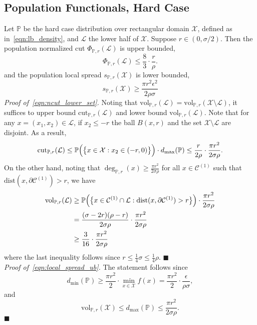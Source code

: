 \documentclass[twoside,11pt]{article}
\newcommand{\1}{\mathbf{1}}
\newcommand{\mc}[1]{\mathcal{#1}}
\newcommand{\Pbb}{\mathbb{P}}
\newcommand{\vol}{\mathrm{vol}}
\newcommand{\cut}{\mathrm{cut}}
\newcommand{\qed}{\hfill $\blacksquare$}
\begin{document}
\subsection{Population Functionals, Hard Case}
\label{subsec:density_cluster_hard_case}
Let $\Pbb$ be the hard case distribution over rectangular domain $\mc{X}$, defined as in~\eqref{eqn:lb_density}, and $\mc{L}$ the lower half of $\mc{X}$. Suppose $r \in (0,\sigma/2)$. Then the population normalized cut $\Phi_{\Pbb,r}(\mathcal{L})$ is upper bounded,
\begin{equation}
\label{eqn:ncut_lower_set}
\Phi_{\Pbb,r}(\mc{L}) \leq \frac{8}{3} \cdot \frac{r}{\rho}.
\end{equation}
and the population local spread $s_{\Pbb,r}(\mc{X})$ is lower bounded,
\begin{equation}
\label{eqn:local_spread_ub}
s_{\Pbb,r}(\mc{X}) \geq \frac{\pi r^2 \epsilon^2}{2 \rho\sigma}
\end{equation}
\emph{Proof of~\eqref{eqn:ncut_lower_set}.}
Noting that $\vol_{\Pbb,r}(\mathcal{L}) = \vol_{\Pbb,r}(\mathcal{X} \setminus \mathcal{L})$, it suffices to upper bound $\cut_{\Pbb,r}(\mathcal{L})$ and lower bound $\vol_{\Pbb,r}(\mathcal{L})$. Note that for any $x = (x_1,x_2) \in \mathcal{L}$, if $x_2 \leq -r$ the ball $B(x,r)$ and the set $\mathcal{X}\setminus\mathcal{L}$ are disjoint. As a result,
\begin{equation*}
\cut_{\Pbb,r}(\mathcal{L}) \leq \Pbb\Bigl(\bigl\{x \in \mathcal{X}: x_2 \in (-r,0)\bigr\}\Bigr) \cdot d_{\max}(\Pbb) \leq \frac{r}{2 \rho} \cdot \frac{\pi r^2}{2 \sigma \rho}.
\end{equation*}
On the other hand, noting that $\deg_{\Pbb,r}(x) \geq \frac{\pi r^2}{2 \sigma \rho}$ for all $x \in \mc{C}^{(1)}$ such that $\mathrm{dist}(x, \partial \mc{C}^{(1)}) > r$, we have
\begin{align*}
\vol_{\Pbb,r}(\mathcal{L}) & \geq \Pbb\Bigl(\bigl\{x \in \mc{C}^{(1)} \cap \mathcal{L}: \mathrm{dist}(x, \partial \mc{C}^{(1)}) > r\bigr\}\Bigr) \cdot \frac{\pi r^2}{2 \sigma \rho} \\
& = \frac{(\sigma - 2r)(\rho - r)}{2 \sigma \rho} \cdot \frac{\pi r^2}{2 \sigma \rho}  \\
& \geq \frac{3}{16} \cdot \frac{\pi r^2}{2 \sigma \rho}
\end{align*}
where the last inequality follows since $r \leq \frac{1}{4}\sigma \leq \frac{1}{4}\rho$. \qed \\ 

\noindent \emph{Proof of~\eqref{eqn:local_spread_ub}.}
The statement follows since 
\begin{equation*}
d_{\min}(\Pbb) \geq \frac{\pi r^2}{2} \cdot \min_{x \in \mc{X}} f(x) = \frac{\pi r^2}{2} \cdot \frac{\epsilon}{\rho \sigma},
\end{equation*}
and
\begin{equation*}
\vol_{\Pbb,r}(\mc{X}) \leq d_{\max}(\Pbb) \leq \frac{\pi r^2}{2 \sigma \rho}.
\end{equation*} \qed
\end{document}
